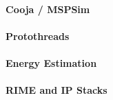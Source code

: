 
\cite{Christin_Reinhardt_Mogre_Steinmetz_2009}

\paragraph{Cooja / MSPSim}
\cite{Eriksson:2009:CIT:1537614.1537650} %

\paragraph{Protothreads}
\cite{Dunkels:2006:PSE:1182807.1182811} %

\paragraph{Energy Estimation}
\cite{Dunkels:2007:SOE:1278972.1278979} %

\paragraph{RIME and IP Stacks}

